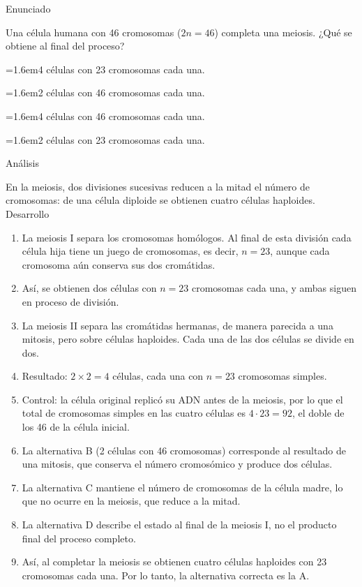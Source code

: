\documentclass[10pt,a4paper,twocolumn]{article}
\newcommand{\alternativa}[2]{\par\noindent\hangindent=1.6em\hangafter=1\makebox[1.6em][l]{\tecla{#1}}#2\par}
\newcommand{\clave}[1]{\par\smallskip{\sffamily\footnotesize\color{esmeralda} Clave \teclaok{#1}}\par}
\begin{document}
\begin{ejemplo}
{\sffamily\footnotesize\color{zinc500} Enunciado}\par
Una célula humana con 46 cromosomas ($2n = 46$) completa una meiosis. ¿Qué se obtiene al final del proceso?
\alternativa{A}{4 células con 23 cromosomas cada una.}
\alternativa{B}{2 células con 46 cromosomas cada una.}
\alternativa{C}{4 células con 46 cromosomas cada una.}
\alternativa{D}{2 células con 23 cromosomas cada una.}
\clave{A}
{\sffamily\footnotesize\color{zinc500} Análisis}\par En la meiosis, dos divisiones sucesivas reducen a la mitad el número de cromosomas: de una célula diploide se obtienen cuatro células haploides.
{\sffamily\footnotesize\color{zinc500} Desarrollo}
\begin{enumerate}
  \item La meiosis I separa los cromosomas homólogos. Al final de esta división cada célula hija tiene un juego de cromosomas, es decir, $n = 23$, aunque cada cromosoma aún conserva sus dos cromátidas.
  \item Así, se obtienen dos células con $n = 23$ cromosomas cada una, y ambas siguen en proceso de división.
  \item La meiosis II separa las cromátidas hermanas, de manera parecida a una mitosis, pero sobre células haploides. Cada una de las dos células se divide en dos.
  \item Resultado: $2 \times 2 = 4$ células, cada una con $n = 23$ cromosomas simples.
  \item Control: la célula original replicó su ADN antes de la meiosis, por lo que el total de cromosomas simples en las cuatro células es $4 \cdot 23 = 92$, el doble de los 46 de la célula inicial.
  \item La alternativa B (2 células con 46 cromosomas) corresponde al resultado de una mitosis, que conserva el número cromosómico y produce dos células.
  \item La alternativa C mantiene el número de cromosomas de la célula madre, lo que no ocurre en la meiosis, que reduce a la mitad.
  \item La alternativa D describe el estado al final de la meiosis I, no el producto final del proceso completo.
  \item Así, al completar la meiosis se obtienen cuatro células haploides con 23 cromosomas cada una. Por lo tanto, la alternativa correcta es la A.
\end{enumerate}
\end{ejemplo}
\end{document}
